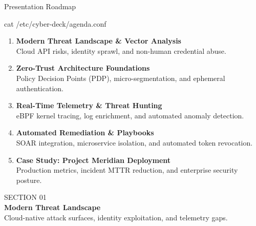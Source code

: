 \documentclass[aspectratio=169, 10pt]{beamer}
\begin{document}
\begin{frame}{Presentation Roadmap}
  \begin{terminalbox}{cat /etc/cyber-deck/agenda.conf}
    \vspace{1pt}
    \begin{enumerate}
      \item[\color{cybercyan}\ttfamily \lbrack 01\rbrack] {\bfseries Modern Threat Landscape \& Vector Analysis} \\
      {\color{textmuted}\small Cloud API risks, identity sprawl, and non-human credential abuse.} \vspace{3pt}
      
      \item[\color{cybercyan}\ttfamily \lbrack 02\rbrack] {\bfseries Zero-Trust Architecture Foundations} \\
      {\color{textmuted}\small Policy Decision Points (PDP), micro-segmentation, and ephemeral authentication.} \vspace{3pt}
      
      \item[\color{cybercyan}\ttfamily \lbrack 03\rbrack] {\bfseries Real-Time Telemetry \& Threat Hunting} \\
      {\color{textmuted}\small eBPF kernel tracing, log enrichment, and automated anomaly detection.} \vspace{3pt}
      
      \item[\color{cybercyan}\ttfamily \lbrack 04\rbrack] {\bfseries Automated Remediation \& Playbooks} \\
      {\color{textmuted}\small SOAR integration, microservice isolation, and automated token revocation.} \vspace{3pt}
      
      \item[\color{cybercyan}\ttfamily \lbrack 05\rbrack] {\bfseries Case Study: Project Meridian Deployment} \\
      {\color{textmuted}\small Production metrics, incident MTTR reduction, and enterprise security posture.}
    \end{enumerate}
  \end{terminalbox}
\end{frame}

\begin{frame}[plain]
  \vfill
  \begin{tcolorbox}[
    enhanced,
    colback=bgcard,
    colframe=cybercyan,
    arc=4pt,
    boxrule=1.2pt,
    left=15pt, right=15pt, top=15pt, bottom=15pt
  ]
    {\ttfamily\color{cybercyan}\large SECTION 01} \\[4pt]
    {\Huge\bfseries\color{textlight} Modern Threat Landscape} \\[8pt]
    {\color{textmuted}\small Cloud-native attack surfaces, identity exploitation, and telemetry gaps.}
  \end{tcolorbox}
  \vfill
\end{frame}
\end{document}
